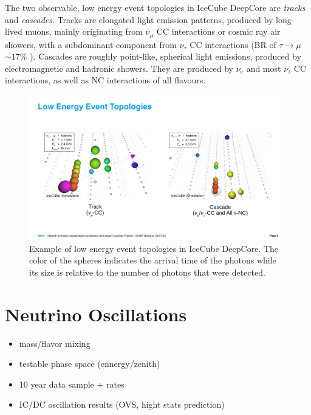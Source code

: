 \documentclass[a4paper,11pt]{article}
\begin{document}
The two observable, low energy event topologies in IceCube DeepCore are \textit{tracks} and \textit{cascades}. Tracks are elongated light emission patterns, produced by long-lived muons, mainly originating from $\nu_{\mu}$ CC interactions or cosmic ray air showers, with a subdominant component from $\nu_{\tau}$ CC interactions (BR of $\tau\rightarrow\mu$ $\sim 17\%$ \cite{PhysRevD.98.030001}). Cascades are roughly point-like, spherical light emissions, produced by electromagnetic and hadronic showers. They are produced by $\nu_{e}$ and most $\nu_{\tau}$ CC interactions, as well as NC interactions of all flavours.

\begin{figure}[h]
  \includegraphics[trim = 2cm 3cm 2cm 5cm, clip, width=1.0\linewidth]{figures/event_views.png}
  \caption{Example of low energy event topologies in IceCube DeepCore. The color of the spheres indicates the arrival time of the photons while its size is relative to the number of photons that were detected.}
  \label{fig:low_energy_eventviews}
\end{figure}


\section{Neutrino Oscillations} \label{sec:neutrino_oscillations}

\begin{itemize}
  \item mass/flavor mixing
  \item testable phase space (ennergy/zenith)
  \item 10 year data sample + rates
  \item IC/DC oscillation results (OVS, hight stats prediction)
\end{itemize}
\end{document}
